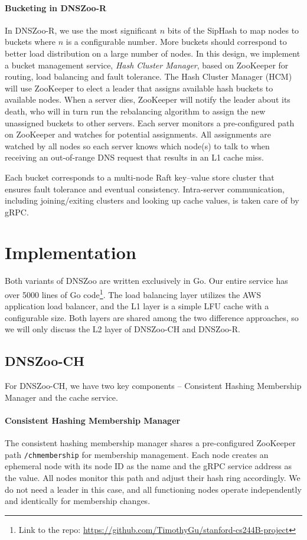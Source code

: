 \documentclass[format=sigconf,nonacm,screen]{acmart}
\newcommand{\dnszoo}{\textsf{DNSZoo}}
\newcommand{\dnszooch}{\textsf{DNSZoo-CH}}
\newcommand{\dnszoor}{\textsf{DNSZoo-R}}
\begin{document}
\paragraph{\textbf{Bucketing in \dnszoor{}}}
In \dnszoor{}, we use the most significant $n$ bits of the SipHash to map nodes to buckets where $n$ is a configurable number. More buckets should correspond to better load distribution on a large number of nodes. In this design, we implement a bucket management service, \textit{Hash Cluster Manager}, based on ZooKeeper for routing, load balancing and fault tolerance. The Hash Cluster Manager (HCM) will use ZooKeeper to elect a leader that assigns available hash buckets to available nodes. When a server dies, ZooKeeper will notify the leader about its death, who will in turn run the rebalancing algorithm to assign the new unassigned buckets to other servers. Each server monitors a pre-configured path on ZooKeeper and watches for potential assignments. All assignments are watched by all nodes so each server knows which node(s) to talk to when receiving an out-of-range DNS request that results in an L1 cache miss.

Each bucket corresponds to a multi-node Raft key--value store cluster that ensures fault tolerance and eventual consistency. Intra-server communication, including joining/exiting clusters and looking up cache values, is taken care of by gRPC.

\section{Implementation}
Both variants of \dnszoo{} are written exclusively in Go. Our entire service has over 5000 lines of Go code\footnote{Link to the repo: \url{https://github.com/TimothyGu/stanford-cs244B-project}}. The load balancing layer utilizes the AWS application load balancer, and the L1 layer is a simple LFU cache with a configurable size. Both layers are shared among the two difference approaches, so we will only discuss the L2 layer of \dnszooch{} and \dnszoor{}.

\subsection{\dnszooch{}}

For \dnszooch{}, we have two key components -- Consistent Hashing Membership Manager and the cache service.

\paragraph{\textbf{Consistent Hashing Membership Manager}} The consistent hashing membership manager shares a pre-configured ZooKeeper path \texttt{/chmembership} for membership management. Each node creates an ephemeral node with its node ID as the name and the gRPC service address as the value. All nodes monitor this path and adjust their hash ring accordingly. We do not need a leader in this case, and all functioning nodes operate independently and identically for membership changes.
\end{document}
